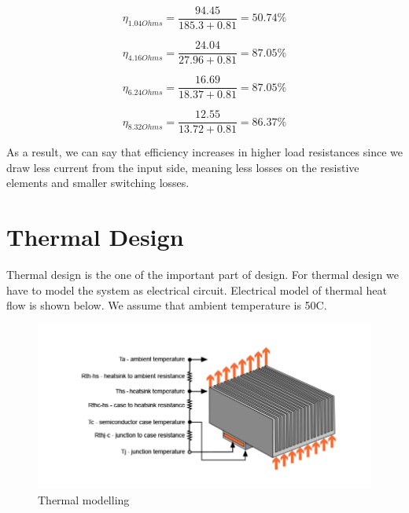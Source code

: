 \documentclass{article}
\newcommand\tab[1][1cm]{\hspace*{#1}}
\begin{document}
\begin{equation*}
    \eta_{1.04 Ohms}=\frac{94.45}{185.3+0.81}=50.74 \%
\end{equation*}

\begin{equation*}
    \eta_{4.16 Ohms}=\frac{24.04}{27.96+0.81}=87.05 \%
\end{equation*}

\begin{equation*}
    \eta_{6.24 Ohms}=\frac{16.69}{18.37+0.81}=87.05 \%
\end{equation*}

\begin{equation*}
    \eta_{8.32 Ohms}=\frac{12.55}{13.72+0.81}=86.37 \%
\end{equation*}

\tab As a result, we can say that efficiency increases in higher load resistances since we draw less current from the input side, meaning less losses on the resistive elements and smaller switching losses.

\section*{Thermal Design}
Thermal design is the one of the important part of design. For thermal design we have to model the system as electrical circuit. Electrical model of thermal heat flow is shown below. We assume that ambient temperature is 50C. 
\begin{figure}[H]
    \centering
    \includegraphics[scale=0.4]{termal.PNG}
    \caption{Thermal modelling}
    \label{fig:my_label}
\end{figure}
\end{document}
